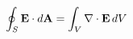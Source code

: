 \documentclass[preview]{standalone}
\begin{document}
\begin{align*}
\special{dvisvgm:raw <g id='unique000'>}\oint_S\mathbf E\cdot d\mathbf A=\int_V\nabla\cdot\mathbf E\,dV\special{dvisvgm:raw </g>}
\end{align*}
\end{document}

